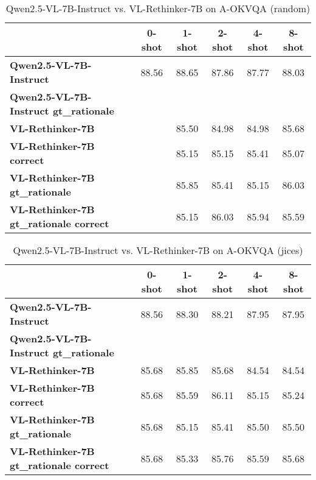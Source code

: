 \begin{table}
\caption{Qwen2.5-VL-7B-Instruct vs. VL-Rethinker-7B on A-OKVQA (random)}
\label{tab:Qwen2.5-VL-7B-Instruct_A-OKVQA_TRAIN_random}
\begin{tabular}{lccccc}
\toprule
 & 0-shot & 1-shot & 2-shot & 4-shot & 8-shot \\
\midrule
\textbf{Qwen2.5-VL-7B-Instruct} & 88.56 & 88.65 & 87.86 & 87.77 & 88.03 \\
\textbf{Qwen2.5-VL-7B-Instruct gt\_rationale} &  &  &  &  &  \\
\textbf{VL-Rethinker-7B} &  & 85.50 & 84.98 & 84.98 & 85.68 \\
\textbf{VL-Rethinker-7B correct} &  & 85.15 & 85.15 & 85.41 & 85.07 \\
\textbf{VL-Rethinker-7B gt\_rationale} &  & 85.85 & 85.41 & 85.15 & 86.03 \\
\textbf{VL-Rethinker-7B gt\_rationale correct} &  & 85.15 & 86.03 & 85.94 & 85.59 \\
\bottomrule
\end{tabular}
\end{table}


\begin{table}
\caption{Qwen2.5-VL-7B-Instruct vs. VL-Rethinker-7B on A-OKVQA (jices)}
\label{tab:Qwen2.5-VL-7B-Instruct_A-OKVQA_TRAIN_jices}
\begin{tabular}{lccccc}
\toprule
 & 0-shot & 1-shot & 2-shot & 4-shot & 8-shot \\
\midrule
\textbf{Qwen2.5-VL-7B-Instruct} & 88.56 & 88.30 & 88.21 & 87.95 & 87.95 \\
\textbf{Qwen2.5-VL-7B-Instruct gt\_rationale} &  &  &  &  &  \\
\textbf{VL-Rethinker-7B} & 85.68 & 85.85 & 85.68 & 84.54 & 84.54 \\
\textbf{VL-Rethinker-7B correct} & 85.68 & 85.59 & 86.11 & 85.15 & 85.24 \\
\textbf{VL-Rethinker-7B gt\_rationale} & 85.68 & 85.15 & 85.41 & 85.50 & 85.50 \\
\textbf{VL-Rethinker-7B gt\_rationale correct} & 85.68 & 85.33 & 85.76 & 85.59 & 85.68 \\
\bottomrule
\end{tabular}
\end{table}



